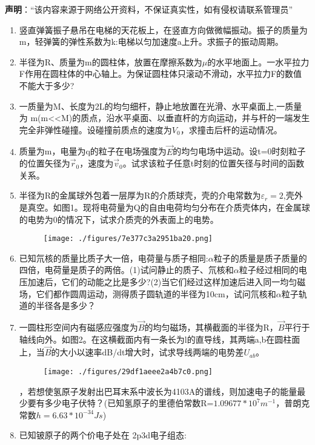 
\textbf{声明}：“该内容来源于网络公开资料，不保证真实性，如有侵权请联系管理员”
\begin{enumerate}
\item 竖直弹簧振子悬吊在电梯的天花板上，在竖直方向做微幅振动。振子的质量为m，轻弹簧的弹性系数为k:电梯以匀加速度a上升。求振子的振动周期。
\item 半径为R、质量为m的圆柱体，放置在摩擦系数为$\mu$的水平地面上。一水平拉力F作用在圆柱体的中心轴上。为保证圆柱体只滚动不滑动，水平拉力F的数值不能大于多少?
\item 一质量为M、长度为2L的均匀细杆，静止地放置在光滑、水平桌面上,一质量为 m(m<<M)的质点，沿水平桌面、以垂直杆的方向运动，并与杆的一端发生完全非弹性碰撞。设碰撞前质点的速度为$V_0$，求撞击后杆的运动情况。
\item 质量为m，电量为q的粒子在电场强度为$\vec E$的均匀电场中运动。设t=0时刻粒子的位置矢径为$\vec r_0$，速度为$\vec v_0$。试求该粒子任意t时刻的位置矢径与时间的函数关系。
\item 半径为R的金属球外包着一层厚为R的介质球壳，壳的介电常数为$\varepsilon_r=2$,壳外是真空。如图1。现将电荷量为Q的自由电荷均匀分布在介质壳体内，在金属球的电势为0的情况下，试求介质壳的外表面上的电势。
\begin{figure}[ht]
\centering
\texttt{[image: ./figures/7e377c3a2951ba20.png]}
\caption{} \label{fig_SSD04_1}
\end{figure}
\item 已知氘核的质量比质子大一倍，电荷量与质子相同:$\alpha$粒子的质量是质子质量的四倍，电荷量是质子的两倍。(1)试问静止的质子、氘核和$\alpha$粒子经过相同的电压加速后，它们的动能之比是多少?(2)当它们经过这样加速后进入同一均匀磁场，它们都作圆周运动，测得质子圆轨道的半径为10cm，试问氘核和$\alpha$粒子轨道的半径各是多少？
\item 一圆柱形空间内有磁感应强度为$\vec B$的均匀磁场，其横截面的半径为R，$\vec B$平行于轴线向外。如图2。在这横截面内有一条长为l的直导线，其两端a,b在圆柱面上，当$\vec B$的大小以速率dB/dt增大时，试求导线两端的电势差$U_{ab}$。
\begin{figure}[ht]
\centering
\texttt{[image: ./figures/29df1aeee2a4b7c0.png]}
\caption{} \label{fig_SSD04_2}
\end{figure}
，若想使氢原子发射出巴耳末系中波长为4103A的谱线，则加速电子的能量最少要有多少电子伏特？(已知氢原子的里德伯常数R=$1.09677*10^7 m^{-1}$，普朗克常数$h=6.63*10^{-34}Js $)
\item 已知铍原子的两个价电子处在 2p3d电子组态:\\

\end{enumerate}
